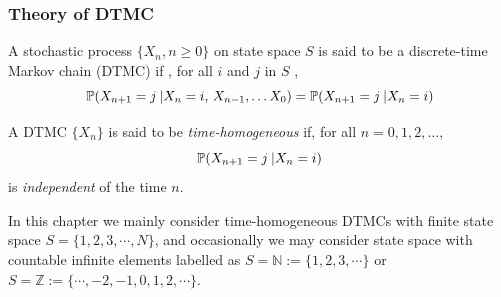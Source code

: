 \documentclass[english,10pt]{beamer}
\begin{document}

\begin{frame}
\frametitle{Theory of DTMC}
\begin{definition}%
A stochastic process $\{X_{n},n\geq0\}$ on state space $S$ is said
to be a discrete-time Markov chain (DTMC) if ,  for all $i$ and
$j$ in $S$ ,
\[
\mathbb{P}(X_{n+1}=j\:\vert X_{n}=i,\, X_{n-1},\ldots X_{0})=\mathbb{P}(X_{n+1}=j\:\vert X_{n}=i)
\]


A DTMC $\{X_{n}\}$ is said to be \textit{time-homogeneous} if, for
all $n=0,1,2,\ldots$,
\[
\mathbb{P}(X_{n+1}=j\:\vert X_{n}=i)
\]
is {\it independent}  of the time $n$.
\end{definition}%
In this chapter we mainly  consider   time-homogeneous DTMCs with
finite state space $S=\{1,2,3,\cdots,N\}$, and  occasionally  
we may consider  state space with countable infinite elements labelled as  $S=\mathbb{N}:=\{1,2,3,\cdots\}$ or 
$S=\mathbb{Z}:=\{\cdots, -2,-1, 0,1,2,\cdots\}$.
\end{frame}
\end{document}
